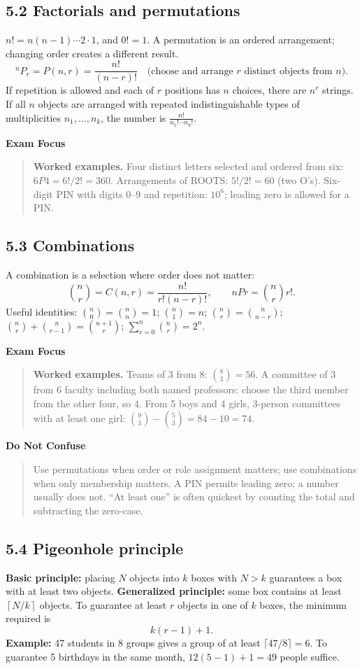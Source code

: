 \documentclass[11pt,a4paper]{article}
\newenvironment{exambox}{\par\medskip\noindent\color{blue}\textbf{Exam Focus}\par\smallskip\color{black}\begin{quote}}{\end{quote}\medskip}
\newenvironment{dangerbox}{\par\medskip\noindent\color{red}\textbf{Do Not Confuse}\par\smallskip\color{black}\begin{quote}}{\end{quote}\medskip}
\begin{document}
\subsection{5.2 Factorials and permutations}
$n!=n(n-1)\cdots2\cdot1$, and $0!=1$. A permutation is an ordered arrangement; changing order creates a different result.
\[
{}^nP_r=P(n,r)=\frac{n!}{(n-r)!}\quad\text{(choose and arrange $r$ distinct objects from $n$).}
\]
If repetition is allowed and each of $r$ positions has $n$ choices, there are $n^r$ strings. If all $n$ objects are arranged with repeated indistinguishable types of multiplicities $n_1,\ldots,n_k$, the number is $\frac{n!}{n_1!\cdots n_k!}$.

\begin{exambox}\textbf{Worked examples.} Four distinct letters selected and ordered from six: $6P4=6!/2!=360$. Arrangements of ROOTS: $5!/2!=60$ (two O's). Six-digit PIN with digits 0--9 and repetition: $10^6$; leading zero is allowed for a PIN.\end{exambox}

\subsection{5.3 Combinations}
A combination is a selection where order does not matter:
\[
{n\choose r}=C(n,r)=\frac{n!}{r!(n-r)!},\qquad nP r={n\choose r}r!.
\]
Useful identities: $\binom n0=\binom nn=1$; $\binom n1=n$; $\binom nr=\binom n{n-r}$; $\binom nr+\binom n{r-1}=\binom{n+1}r$; $\sum_{r=0}^n\binom nr=2^n$.

\begin{exambox}\textbf{Worked examples.} Teams of 3 from 8: $\binom83=56$. A committee of 3 from 6 faculty including both named professors: choose the third member from the other four, so 4. From 5 boys and 4 girls, 3-person committees with at least one girl: $\binom93-\binom53=84-10=74$.\end{exambox}

\begin{dangerbox}Use permutations when order or role assignment matters; use combinations when only membership matters. A PIN permits leading zero; a number usually does not. “At least one” is often quickest by counting the total and subtracting the zero-case.\end{dangerbox}

\subsection{5.4 Pigeonhole principle}
\textbf{Basic principle:} placing $N$ objects into $k$ boxes with $N>k$ guarantees a box with at least two objects. \textbf{Generalized principle:} some box contains at least $\left\lceil N/k\right\rceil$ objects. To guarantee at least $r$ objects in one of $k$ boxes, the minimum required is
\[
k(r-1)+1.
\]
\textbf{Example:} 47 students in 8 groups gives a group of at least $\lceil47/8\rceil=6$. To guarantee 5 birthdays in the same month, $12(5-1)+1=49$ people suffice.
\end{document}
